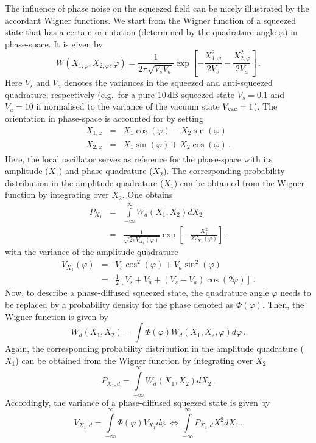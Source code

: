 The influence of phase noise on the squeezed field can be nicely illustrated by the accordant Wigner functions. We start from the Wigner function of a squeezed state that has a certain orientation (determined by the quadrature angle  $\varphi$) in phase-space. It is  given by
\begin{equation}
W(X_{1,\varphi},X_{2,\varphi}, \varphi) = \frac{1}{2\pi\sqrt{V_sV_a}}\exp\left[-\frac{X_{1,\varphi}^2}{2V_s}-\frac{X_{2,\varphi}^2}{2V_a}\right]\,.
\end{equation}
Here $V_s$ and $V_a$ denotes the variances in the squeezed and anti-squeezed quadrature, respectively (e.g.\ for a pure 10\,dB squeezed state  $V_s=0.1$ and $V_a=10$ if normalised to the variance of the vacuum state $V_{\rm{vac}}=1$).  The orientation in phase-space is accounted for by setting
\begin{eqnarray}
X_{1,\varphi} &=& X_1\cos(\varphi) - X_2\sin(\varphi)\\
X_{2,\varphi}  &= &X_1\sin(\varphi) + X_2\cos(\varphi)\,.
\end{eqnarray}
Here, the local oscillator serves as reference for the phase-space with its amplitude ($X_1$) and phase quadrature ($X_2$). The corresponding probability distribution in the amplitude quadrature ($X_1$) can be obtained from the Wigner function by integrating over $X_2$. One obtains
\begin{eqnarray}
P_{X_1} &=& \int\limits_ {-\infty}^{\infty}W_d(X_1,X_2)dX_2\\
&=&\frac{1}{{\sqrt{2\pi V_{X_1}(\varphi)}}}\exp\left[-\frac{X_1^2}{2V_{X_1}(\varphi)} \right]\,.
\end{eqnarray}
with the variance of the amplitude quadrature
\begin{eqnarray}
V_{X_1}(\varphi) &=& V_s\cos^2(\varphi) + V_a\sin^2(\varphi)\\
&=&\frac{1}{2}\left[V_s+V_a+(V_s-V_a)\cos(2\varphi)\right]\,.
\end{eqnarray}
Now, to describe a phase-diffused squeezed state, the quadrature angle $\varphi$ needs to be replaced by a probability density for the phase denoted as $\Phi(\varphi)$. Then, the Wigner function is given by
\begin{equation}
W_d(X_1,X_2) =\int \Phi(\varphi) W_d(X_1,X_2, \varphi)d\varphi\,.
\end{equation}
Again, the corresponding probability distribution in the amplitude quadrature ($X_1$) can be obtained from the Wigner function by integrating over $X_2$
\begin{equation}
P_{X_1,d} = \int\limits_ {-\infty}^{\infty}W_d(X_1,X_2)dX_2 \,.
\end{equation}
Accordingly, the variance of a phase-diffused squeezed state is given by
\begin{equation}
V_{X_1,d} = \int\limits_{-\infty}^{\infty}\Phi(\varphi)V_{X_1}d\varphi\,\Leftrightarrow  \int\limits_{-\infty}^{\infty}P_{X_1,d}X_1^2dX_1\,.\label{eq:varsqzphsdiff}
\end{equation}


